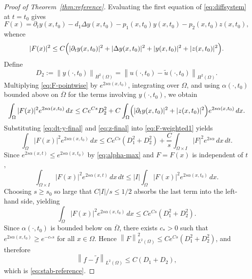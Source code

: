 \documentclass[10pt,a4paper]{amsart}
\newcommand{\Lap}{\Delta}
\newcommand{\Om}{\Omega}
\newcommand{\norm}[1]{\left\lVert#1\right\rVert}
\newcommand{\p}{\partial}
\begin{document}
\begin{proof}[Proof of Theorem~\ref{thm:reference}]
Evaluating the first equation of \eqref{eq:diffsystem} at $t=t_0$ gives
\begin{equation}\label{eq:source-identity}
F(x)=\p_t y(x,t_0)-d_1\Lap y(x,t_0)
-p_1(x,t_0)y(x,t_0)-p_2(x,t_0)z(x,t_0),
\end{equation}
whence
\begin{equation}\label{eq:F-pointwise}
|F(x)|^2\le C\Bigl(|\p_t y(x,t_0)|^2+|\Lap y(x,t_0)|^2
+|y(x,t_0)|^2+|z(x,t_0)|^2\Bigr).
\end{equation}
Define
\begin{equation}\label{eq:D2-def}
D_2:=\norm{y(\cdot,t_0)}_{H^2(\Om)}
=\norm{u(\cdot,t_0)-\tilde u(\cdot,t_0)}_{H^2(\Om)}.
\end{equation}
Multiplying \eqref{eq:F-pointwise} by $e^{2s\alpha(x,t_0)}$, integrating
over $\Om$, and using $\alpha(\cdot,t_0)$ bounded above on $\overline\Om$
for the terms involving $y(\cdot,t_0)$, we obtain
\begin{equation}\label{eq:F-weighted1}
\int_\Om |F(x)|^2 e^{2s\alpha(x,t_0)}\,dx
\le C e^{Cs} D_2^2
+C\int_\Om\Bigl(|\p_t y(x,t_0)|^2+|z(x,t_0)|^2\Bigr)
e^{2s\alpha(x,t_0)}\,dx.
\end{equation}
Substituting \eqref{eq:dt-y-final} and \eqref{eq:z-final} into
\eqref{eq:F-weighted1} yields
\begin{equation}\label{eq:F-weighted2}
\int_\Om |F(x)|^2 e^{2s\alpha(x,t_0)}\,dx
\le C e^{Cs}(D_1^2+D_2^2)
+\frac{C}{s}\int_{\Om\times I}|F|^2 e^{2s\alpha}\,dx\,dt.
\end{equation}
Since $e^{2s\alpha(x,t)}\le e^{2s\alpha(x,t_0)}$ by \eqref{eq:alpha-max}
and $F=F(x)$ is independent of $t$,
\[
\int_{\Om\times I}|F(x)|^2 e^{2s\alpha(x,t)}\,dx\,dt
\le |I|\int_\Om |F(x)|^2 e^{2s\alpha(x,t_0)}\,dx.
\]
Choosing $s\ge s_0$ so large that $C|I|/s\le 1/2$ absorbs the last term into
the left-hand side, yielding
\[
\int_\Om |F(x)|^2 e^{2s\alpha(x,t_0)}\,dx
\le C e^{Cs}(D_1^2+D_2^2).
\]
Since $\alpha(\cdot,t_0)$ is bounded below on $\overline\Om$, there exists
$c_*>0$ such that $e^{2s\alpha(x,t_0)}\ge e^{-c_* s}$ for all
$x\in\Om$.
Hence
$\norm{F}_{L^2(\Om)}^2\le C e^{Cs}(D_1^2+D_2^2)$,
and therefore
$$\norm{f-\tilde f}_{L^2(\Om)}\le C(D_1+D_2),$$
which is \eqref{eq:stab-reference}.
\end{proof}
\end{document}
